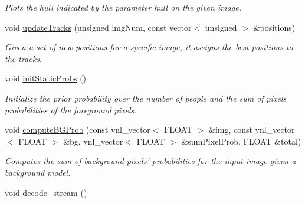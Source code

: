 \begin{DoxyCompactItemize}
\begin{DoxyCompactList}\small\item\em Plots the hull indicated by the parameter {\ttfamily hull} on the given image. \item\end{DoxyCompactList}\item 
\hypertarget{classfindPersonStream_a72cf6436254b05714b2c4064f47bb8f3}{
void \hyperlink{classfindPersonStream_a72cf6436254b05714b2c4064f47bb8f3}{updateTracks} (unsigned imgNum, const vector$<$ unsigned $>$ \&positions)}
\label{classfindPersonStream_a72cf6436254b05714b2c4064f47bb8f3}

\begin{DoxyCompactList}\small\item\em Given a set of new positions for a specific image, it assigns the best positions to the tracks. \item\end{DoxyCompactList}\item 
\hypertarget{classfindPersonStream_ae110e88d8686a64f9acaef610ffdb866}{
void \hyperlink{classfindPersonStream_ae110e88d8686a64f9acaef610ffdb866}{initStaticProbs} ()}
\label{classfindPersonStream_ae110e88d8686a64f9acaef610ffdb866}

\begin{DoxyCompactList}\small\item\em Initialize the prior probability over the number of people and the sum of pixels probabilities of the foreground pixels. \item\end{DoxyCompactList}\item 
\hypertarget{classfindPersonStream_a2be01bae31610ac2b220e7cd2110c090}{
void \hyperlink{classfindPersonStream_a2be01bae31610ac2b220e7cd2110c090}{computeBGProb} (const vnl\_\-vector$<$ FLOAT $>$ \&img, const vnl\_\-vector$<$ FLOAT $>$ \&bg, vnl\_\-vector$<$ FLOAT $>$ \&sumPixelProb, FLOAT \&total)}
\label{classfindPersonStream_a2be01bae31610ac2b220e7cd2110c090}

\begin{DoxyCompactList}\small\item\em Computes the sum of background pixels' probabilities for the input image given a background model. \item\end{DoxyCompactList}\item 
\hypertarget{classfindPersonStream_add3549b9288a1f35499754c8e938a534}{
void \hyperlink{classfindPersonStream_add3549b9288a1f35499754c8e938a534}{decode\_\-stream} ()}
\label{classfindPersonStream_add3549b9288a1f35499754c8e938a534}


\end{DoxyCompactItemize}
